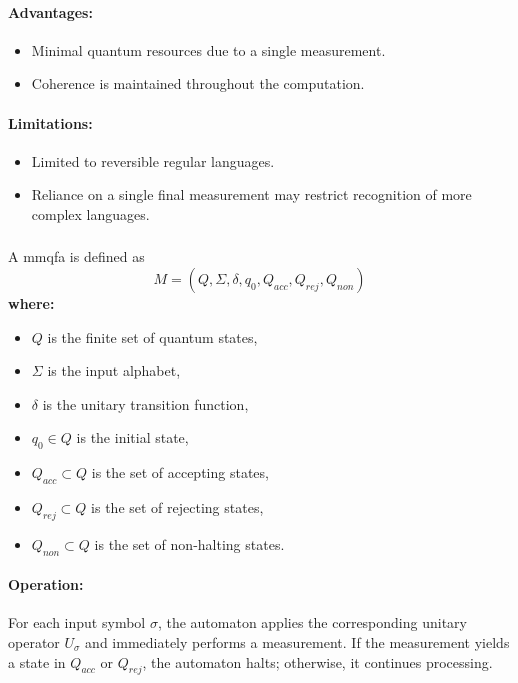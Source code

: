 \paragraph{Advantages:}
\begin{itemize}
    \item Minimal quantum resources due to a single measurement.
    \item Coherence is maintained throughout the computation.
\end{itemize}

\paragraph{Limitations:}
\begin{itemize}
    \item Limited to reversible regular languages.
    \item Reliance on a single final measurement may restrict recognition of more complex languages.
\end{itemize}

\subsubsection{}
\label{subsec:mmqfa}
\begin{definition}
A \gls{mmqfa} is defined as 
\[
M = (Q, \Sigma, \delta, q_0, Q_{acc}, Q_{rej}, Q_{non})
\]
\textbf{where:}
\begin{itemize}
    \item \( Q \) is the finite set of quantum states,
    \item \( \Sigma \) is the input alphabet,
    \item \( \delta \) is the unitary transition function,
    \item \( q_0 \in Q \) is the initial state,
    \item \( Q_{acc} \subset Q \) is the set of accepting states,
    \item \( Q_{rej} \subset Q \) is the set of rejecting states,
    \item \( Q_{non} \subset Q \) is the set of non-halting states.
\end{itemize}
\end{definition}

\paragraph{Operation:}  
For each input symbol \( \sigma \), the automaton applies the corresponding unitary operator \( U_\sigma \) and immediately performs a measurement. If the measurement yields a state in \( Q_{acc} \) or \( Q_{rej} \), the automaton halts; otherwise, it continues processing.

